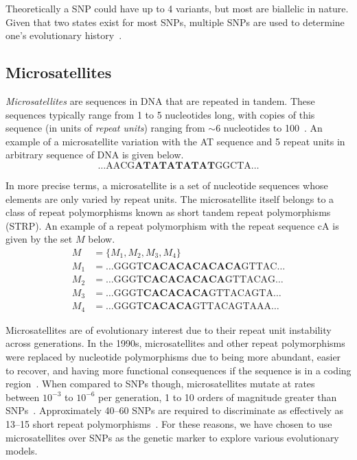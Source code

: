 Theoretically a SNP could have up to 4 variants, but most are biallelic in nature.
Given that two states exist for most SNPs, multiple SNPs are used to determine one's evolutionary
history~\cite{jehanSingleNucleotidePolymorphism2006}.

\subsection{Microsatellites}\label{subsec:m}
\emph{Microsatellites} are sequences in DNA that are repeated in tandem.
These sequences typically range from 1 to 5 nucleotides long, with copies of this sequence (in units of
\emph{repeat units}) ranging from $\sim 6$ nucleotides to
100~\cite{roseThresholdSizeMicrosatellite1998,fanBriefReviewShort2007}.
An example of a microsatellite variation with the AT sequence and 5 repeat units in arbitrary
sequence of DNA is given below.
\begin{equation*}
     \ldots \text{AACG}\textbf{ATATATATAT}\text{GGCTA} \ldots
\end{equation*}

In more precise terms, a microsatellite is a set of nucleotide sequences whose elements are only varied by repeat units.
The microsatellite itself belongs to a class of repeat polymorphisms known as short tandem repeat polymorphisms (STRP).
An example of a repeat polymorphism with the repeat sequence cA is given by the set $M$ below.
\begin{align*}
    M &= \{ M_1, M_2, M_3, M_4 \} \\
    M_1 &= \ldots \text{GGGT}\textbf{CACACACACACA}\text{GTTAC} \ldots \\
    M_2 &= \ldots \text{GGGT}\textbf{CACACACACA}\text{GTTACAG} \ldots \\
    M_3 &= \ldots \text{GGGT}\textbf{CACACACA}\text{GTTACAGTA} \ldots \\
    M_4 &= \ldots \text{GGGT}\textbf{CACACA}\text{GTTACAGTAAA} \ldots
\end{align*}

Microsatellites are of evolutionary interest due to their repeat unit instability across generations.
In the 1990s, microsatellites and other repeat polymorphisms were replaced by nucleotide polymorphisms due to being
more abundant, easier to recover, and having more functional consequences if the sequence is in a coding
region~\cite{graySingleNucleotidePolymorphisms2000,butlerSTRsVsSNPs2007}.
When compared to SNPs though, microsatellites mutate at rates between $10^{-3}$ to $10^{-6}$ per generation,
1 to 10 orders of magnitude greater than SNPs~\cite{gemayelJunkVariableTandemRepeats2012}.
Approximately 40--60 SNPs are required to discriminate as effectively as 13--15 short repeat
polymorphisms~\cite{butlerSTRsVsSNPs2007}.
For these reasons, we have chosen to use microsatellites over SNPs as the genetic marker to explore various evolutionary
models.
